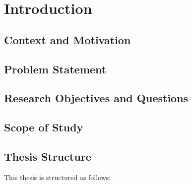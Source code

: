\section{Introduction}

\subsection{Context and Motivation}

\subsection{Problem Statement}

\subsection{Research Objectives and Questions}

\subsection{Scope of Study}

\subsection{Thesis Structure}

This thesis is structured as follows:
